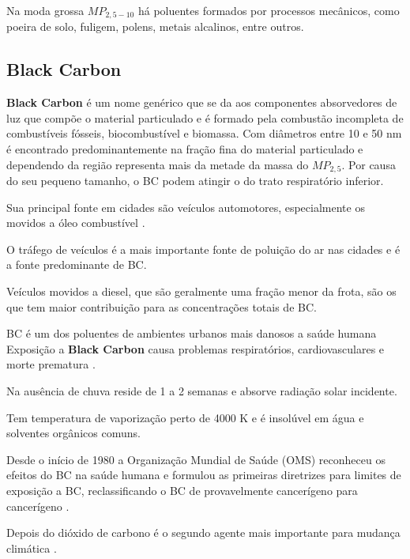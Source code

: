 Na moda grossa $MP_{2,5-10}$ há poluentes formados por processos mecânicos, 
como poeira de solo, fuligem, polens, metais alcalinos, entre outros. 

\subsection{Black Carbon}

\textbf{Black Carbon} é um nome genérico que se da aos componentes
absorvedores de luz que compõe o material particulado e é formado pela combustão
incompleta de combustíveis fósseis, biocombustível e biomassa.
Com diâmetros entre 10 e 50 nm é encontrado predominantemente na fração fina 
do material particulado e dependendo da região representa mais da metade 
da massa do $MP_{2,5}$. Por causa do seu pequeno tamanho, o BC podem atingir o
do trato respiratório inferior.

Sua principal fonte em cidades são veículos automotores, 
especialmente os movidos a óleo combustível \citep{petzold2013}. 

O tráfego de veículos é a mais importante fonte de poluição do ar 
nas cidades e é a fonte predominante de BC. 

Veículos movidos a diesel, que são geralmente uma fração menor da frota, são 
os que tem maior contribuição para as concentrações totais de BC. 



BC é um dos poluentes de ambientes urbanos mais danosos a saúde humana 
Exposição a \textbf{Black Carbon} causa problemas respiratórios, 
cardiovasculares e morte prematura \citep{jacobson2014}.

Na ausência de chuva reside de 1 a 2 semanas e absorve radiação solar incidente.

Tem temperatura de vaporização perto de 4000 K e é insolúvel em água e 
solventes orgânicos comuns.

Desde o início de 1980 a Organização Mundial de Saúde (OMS)
reconheceu os efeitos do BC na saúde humana e formulou as primeiras diretrizes
para limites de exposição a BC, reclassificando o BC de 
provavelmente cancerígeno para cancerígeno \citep{petzold2013}.

Depois do dióxido de carbono é o segundo agente mais importante
para  mudança climática \citep{bond2013}.



